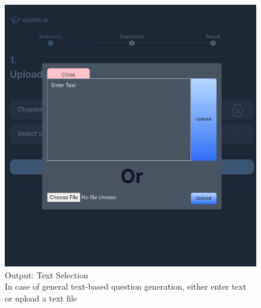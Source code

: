 \documentclass[12pt]{report}
\begin{document}
\begin{figure}[ht!]
    \centering
    \includegraphics[scale = 0.4]{Images/TextSelect.png}
    \captionsetup{justification=centering} 
    \caption{Output: Text Selection\\ In case of general text-based question generation, either enter text or upload a text file}
\end{figure}
\pagebreak
\end{document}
